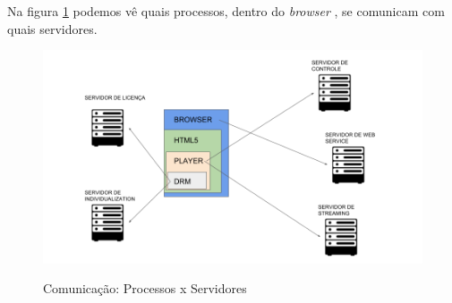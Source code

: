 Na figura \ref{figura:autenticacao_conteudo} podemos v\^e quais processos, dentro do \textit{browser} , se comunicam com quais servidores.
\begin{figure}[H]
\caption{Comunica\c{c}\~ao: Processos x Servidores}
\includegraphics[width=14cm]{Figuras/autenticacao_conteudo.png} 
\label{figura:autenticacao_conteudo}
\end{figure}